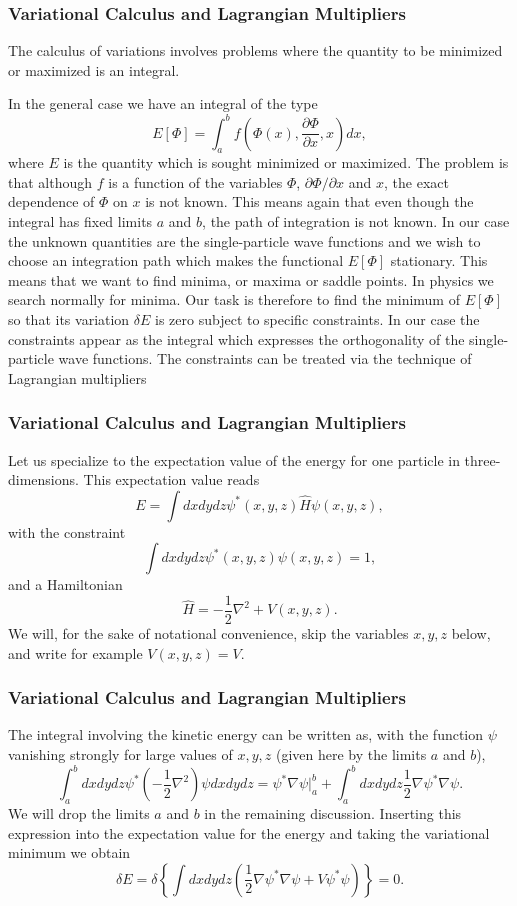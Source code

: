 \documentclass{beamer}
\begin{document}
\begin{frame}
\frametitle{Variational Calculus and Lagrangian Multipliers}

\begin{block}{}
The calculus of variations involves 
problems where the quantity to be minimized or maximized is an integral. 

In the general case we have an integral of the type
\[ 
E[\Phi]= \int_a^b f(\Phi(x),\frac{\partial \Phi}{\partial x},x)dx,
\]
where $E$ is the quantity which is sought minimized or maximized.
The problem is that although $f$ is a function of the variables $\Phi$, $\partial \Phi/\partial x$ and $x$, the exact dependence of
$\Phi$ on $x$ is not known.  This means again that even though the integral has fixed limits $a$ and $b$, the path of integration is
not known. In our case the unknown quantities are the single-particle wave functions and we wish to choose an integration path which makes
the functional $E[\Phi]$ stationary. This means that we want to find minima, or maxima or saddle points. In physics we search normally for minima.
Our task is therefore to find the minimum of $E[\Phi]$ so that its variation $\delta E$ is zero  subject to specific
constraints. In our case the constraints appear as the integral which expresses the orthogonality of the  single-particle wave functions.
The constraints can be treated via the technique of Lagrangian multipliers
\end{block}
\end{frame}

\begin{frame}
\frametitle{Variational Calculus and Lagrangian Multipliers}

\begin{block}{}
Let us specialize to the expectation value of the energy for one particle in three-dimensions.
This expectation value reads
\[
  E=\int dxdydz \psi^*(x,y,z) \hat{H} \psi(x,y,z),
\]
with the constraint
\[
 \int dxdydz \psi^*(x,y,z) \psi(x,y,z)=1,
\]
and a Hamiltonian
\[
\hat{H}=-\frac{1}{2}\nabla^2+V(x,y,z).
\]
We will, for the sake of notational convenience,  skip the variables $x,y,z$ below, and write for example $V(x,y,z)=V$.
\end{block}
\end{frame}

\begin{frame}
\frametitle{Variational Calculus and Lagrangian Multipliers}

\begin{block}{}
The integral involving the kinetic energy can be written as, with the function $\psi$ vanishing
strongly for large values of $x,y,z$ (given here by the limits $a$ and $b$), 
 \[
  \int_a^b dxdydz \psi^* \left(-\frac{1}{2}\nabla^2\right) \psi dxdydz = \psi^*\nabla\psi|_a^b+\int_a^b dxdydz\frac{1}{2}\nabla\psi^*\nabla\psi.
\]
We will drop the limits $a$ and $b$ in the remaining discussion. 
Inserting this expression into the expectation value for the energy and taking the variational minimum  we obtain
\[
\delta E = \delta \left\{\int dxdydz\left( \frac{1}{2}\nabla\psi^*\nabla\psi+V\psi^*\psi\right)\right\} = 0.
\]
\end{block}
\end{frame}
\end{document}
